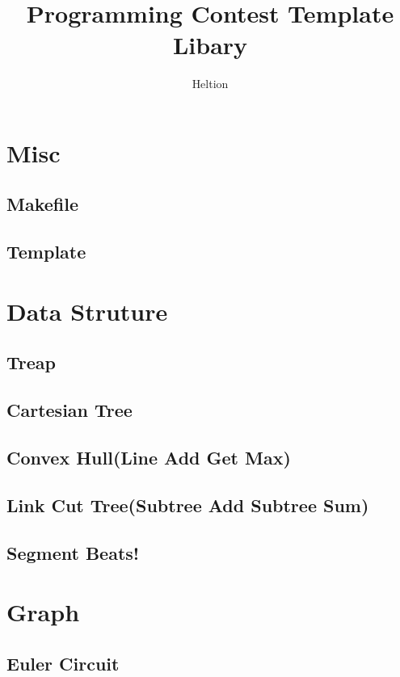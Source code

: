 \documentclass{article}
\begin{document}
\title{Programming Contest Template Libary}
\author{Heltion}
\maketitle
\newpage
\tableofcontents
\newpage
\section{Misc}
    \subsection{Makefile}
        
    \subsection{Template}
        
\section{Data Struture}
    \subsection{Treap}
        
    \subsection{Cartesian Tree}
        
    \subsection{Convex Hull(Line Add Get Max)}
        
    \subsection{Link Cut Tree(Subtree Add Subtree Sum)}
        
    \subsection{Segment Beats!}
        
\section{Graph}
    \subsection{Euler Circuit}
        
\end{document}
